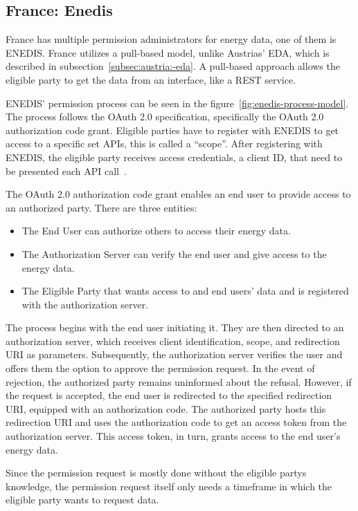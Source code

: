 \subsection{France: Enedis}\label{subsec:france:-enedis}
France has multiple permission administrators for energy data, one of them is ENEDIS.
France utilizes a pull-based model, unlike Austrias' EDA, which is described in subsection\ \ref{subsec:austria:-eda}.
A pull-based approach allows the eligible party to get the data from an interface, like a REST service.

ENEDIS' permission process can be seen in the figure\ \ref{fig:enedis-process-model}.
The process follows the OAuth 2.0 specification, specifically the OAuth 2.0 authorization code grant.
Eligible parties have to register with ENEDIS to get access to a specific set APIs, this is called a ``scope''.
After registering with ENEDIS, the eligible party receives access credentials, a client ID, that need to be presented each API call~\cite{rfc6749-oauth, enedis-dev-guide}.

The OAuth 2.0 authorization code grant enables an end user to provide access to an authorized party.
There are three entities:
\begin{itemize}
    \item{The End User} can authorize others to access their energy data.
    \item{The Authorization Server} can verify the end user and give access to the energy data.
    \item{The Eligible Party} that wants access to and end users' data and is registered with the authorization server.
\end{itemize}
The process begins with the end user initiating it.
They are then directed to an authorization server, which receives client identification, scope, and redirection URI as parameters.
Subsequently, the authorization server verifies the user and offers them the option to approve the permission request.
In the event of rejection, the authorized party remains uninformed about the refusal.
However, if the request is accepted, the end user is redirected to the specified redirection URI, equipped with an authorization code.
The authorized party hosts this redirection URI and uses the authorization code to get an access token from the authorization server.
This access token, in turn, grants access to the end user's energy data\cite{enedis-dev-guide,rfc6749-oauth}.

Since the permission request is mostly done without the eligible partys knowledge, the permission request itself only needs a timeframe in which the eligible party wants to request data.

